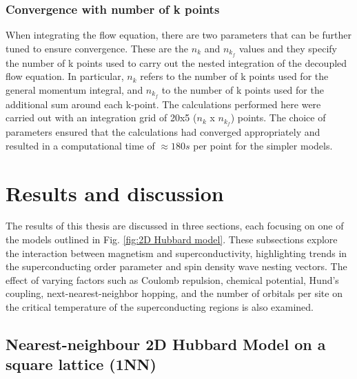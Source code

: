 \documentclass[12pt]{article}
\begin{document}
\subsubsection{Convergence with number of k points }

When integrating the flow equation, there are two parameters that can be further tuned to ensure convergence.
These are the $n_k$ and $n_{k_f}$ values and they specify the number of k points used to carry out the nested integration of the decoupled flow equation. 
In particular, $n_k$ refers to the number of k points used for the general momentum integral, and $n_{k_f}$ to the number of k points used for 
the additional sum around each k-point. The calculations performed here were carried out with an integration 
grid of 20x5 ($n_k$ x $n_{k_f}$) points. The choice of parameters ensured that the calculations had converged appropriately 
and resulted in a computational time of $\approx 180s$ per point for the simpler models. 


\section{Results and discussion}

The results of this thesis are discussed in three sections, each focusing on one of the models outlined in Fig. \ref{fig:2D Hubbard model}.
These subsections explore the interaction between magnetism and superconductivity, highlighting trends in the superconducting order parameter 
and spin density wave nesting vectors. The effect of varying factors such as Coulomb repulsion, 
chemical potential, Hund's coupling, next-nearest-neighbor hopping, and the number of orbitals per site 
on the critical temperature of the superconducting regions is also examined.

\subsection{Nearest-neighbour 2D Hubbard Model on a square lattice (1NN)}
\label{subsec:1NNModel}
\end{document}
